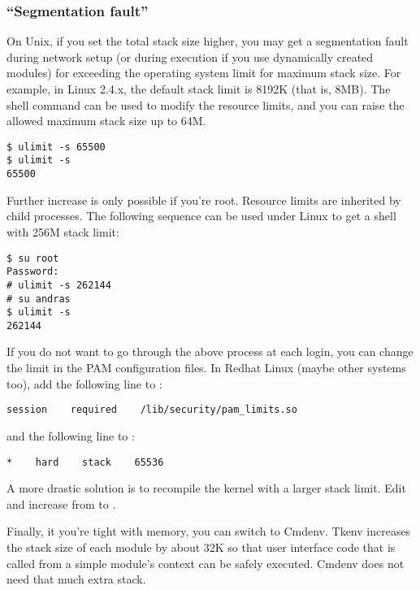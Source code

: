 \subsubsection{``Segmentation fault''}

On Unix, if you set the total stack size higher, you may get a
segmentation fault during network setup (or
during execution if you use dynamically created modules) for exceeding
the operating system limit for maximum stack size. For example, in
Linux 2.4.x, the default stack limit is 8192K (that is, 8MB). The
 shell command can be used to modify the
resource limits, and you can raise the allowed maximum stack size
up to 64M.

\begin{verbatim}
$ ulimit -s 65500
$ ulimit -s
65500
\end{verbatim}

Further increase is only possible if you're root.
Resource limits are inherited by child processes.
The following sequence can be used under Linux to get a shell with
256M stack limit:

\begin{verbatim}
$ su root
Password:
# ulimit -s 262144
# su andras
$ ulimit -s
262144
\end{verbatim}

If you do not want to go through the above process at each login, you
can change the limit in the PAM configuration files. In Redhat Linux
(maybe other systems too), add the following line to
:

\begin{verbatim}
session    required    /lib/security/pam_limits.so
\end{verbatim}

and the following line to :

\begin{verbatim}
*    hard    stack    65536
\end{verbatim}

\begin{sloppypar}
A more drastic solution is to recompile the kernel with a larger stack
limit. Edit  and increase
 from  to .
\end{sloppypar}

Finally, it you're tight with memory, you can switch to Cmdenv. Tkenv
increases the stack size of each module by about 32K so that user interface code that is called from a
simple module's context can be safely executed.
Cmdenv does not need that much extra stack.


